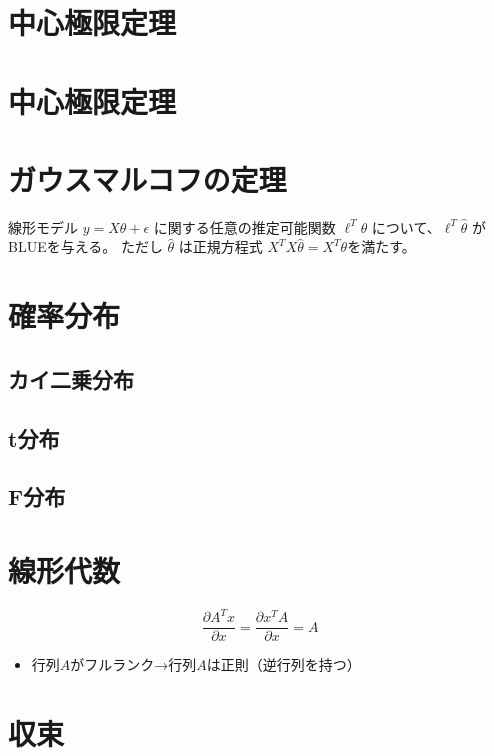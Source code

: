 \documentclass[10pt,a4paper]{ltjsarticle}
\begin{document}
\section{中心極限定理}


\section{中心極限定理}

\section{ガウスマルコフの定理}

線形モデル $y = X\theta + \epsilon$ に関する任意の推定可能関数 $\ell^T\theta$ について、$\ell^T\hat{\theta}$ が BLUEを与える。
ただし $\hat{\theta}$ は正規方程式 $X^TX\hat{\theta} = X^T\theta$を満たす。


\section{確率分布}

\subsection{カイ二乗分布}
\subsection{t分布}
\subsection{F分布}


\section{線形代数}


\begin{equation}
  \frac{\partial A^Tx}{\partial x} = \frac{\partial x^TA}{\partial x}= A
\end{equation}

\begin{itemize}
  \item 行列$A$がフルランク→行列$A$は正則（逆行列を持つ）
\end{itemize}

\section{収束}
\end{document}
